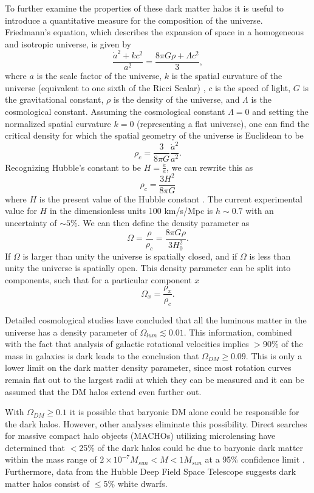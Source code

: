 \documentclass[a4paper,12pt]{article}
\begin{document}
To further examine the properties of these dark matter halos it is useful to introduce a quantitative measure for the composition of the universe.  Friedmann's equation, which describes the expansion of space in a homogeneous and isotropic universe, is given by
\[\frac{\dot{a}^2 + kc^2}{a^2} = \frac{8 \pi G \rho + \Lambda c^2}{3},\]
where $a$ is the scale factor of the universe, $k$ is the spatial curvature of the universe (equivalent to one sixth of the Ricci Scalar) , $c$ is the speed of light, $G$ is the gravitational constant, $\rho$ is the density of the universe, and $\Lambda$ is the cosmological constant. Assuming the cosmological constant $\Lambda = 0$ and setting the normalized spatial curvature $k = 0$ (representing a flat universe), one can find the critical density for which the spatial geometry of the universe is Euclidean to be
\[\rho_c = \frac{3}{8 \pi G}\frac{\dot{a}^2}{a^2}.\]
Recognizing Hubble's constant to be $ H = \frac { \dot{a}}{a} $, we can rewrite this as
\[\rho_c =\frac{3H^2}{8 \pi G} \]
where $H$ is the present value of the Hubble constant \cite{Javorsek}. The current experimental value for $H$ in the dimensionless units 100 km/s/Mpc is $ h \sim 0.7 $ with an uncertainty of $\sim5\%$.  We can then define the density parameter as 
\[\Omega=\frac{\rho}{\rho_c}=\frac{8 \pi G \rho}{3 H_0^2}.\]
If $\Omega$ is larger than unity the universe is spatially closed, and if $\Omega$ is less than unity the universe is spatially open. This density parameter can be split into components, such that for a particular component $x$
\[\Omega_x = \frac{\rho_x}{\rho_c}.\]

Detailed cosmological studies have concluded that all the luminous matter in the universe has a density parameter of $\Omega_{lum} \lesssim 0.01$.  This information, combined  with the fact that analysis of galactic rotational velocities implies $> $90\% of the mass in galaxies is dark leads to the conclusion that $\Omega_{DM} \geq 0.09$.  This is only a lower limit on the dark matter density parameter, since most rotation curves remain flat out to the largest radii at which they can be measured and it can be assumed that the DM halos extend even further out.


With $\Omega_{DM} \geq 0.1$ it is possible that baryonic DM alone could be responsible for the dark halos.  However, other analyses eliminate this possibility. Direct searches for massive compact halo objects (MACHOs) utilizing microlensing have determined that $<$25\% of the dark halos could be due to baryonic dark matter within the mass range of $ 2 \times 10^{-7} M_{sun} < M < 1 M_{sun} $ at a 95\% confidence limit \cite{EROS,Alcock}. Furthermore, data from the Hubble Deep Field Space Telescope suggests dark matter halos consist of $\leq$5\% white dwarfs.
\end{document}
